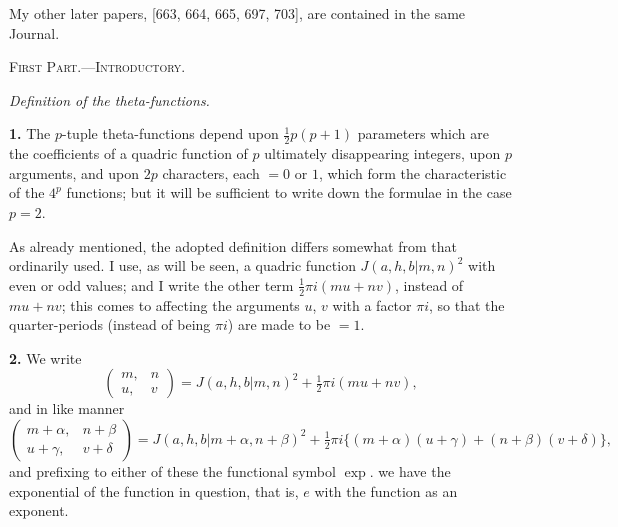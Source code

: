 \documentclass[12pt,a4paper]{article}
\newcommand{\cbtw}{\vert}  %
\theoremstyle{definition}
\begin{document}
My other later papers, [663, 664, 665, 697, 703], are contained in the same Journal.

\vspace{1em}

\begin{center}
\textsc{First Part.---Introductory.}
\end{center}

\vspace{0.5em}

\begin{center}
\textit{Definition of the theta-functions.}
\end{center}

\vspace{0.5em}

\noindent\textbf{1.}\quad
The $p$-tuple theta-functions depend upon $\frac{1}{2}p(p+1)$ parameters which are the coefficients of a quadric function of $p$ ultimately disappearing integers, upon $p$ arguments, and upon $2p$ characters, each $= 0$ or $1$, which form the characteristic of the $4^p$ functions; but it will be sufficient to write down the formulae in the case $p = 2$.

As already mentioned, the adopted definition differs somewhat from that ordinarily used. I use, as will be seen, a quadric function $J(a, h, b\cbtw m, n)^2$ with even or odd values; and I write the other term $\frac{1}{2}\pi i(mu + nv)$, instead of $mu + nv$; this comes to affecting the arguments $u$, $v$ with a factor $\pi i$, so that the quarter-periods (instead of being $\pi i$) are made to be $= 1$.

\noindent\textbf{2.}\quad
We write
\[
\begin{pmatrix} m, & n \\ u, & v \end{pmatrix} = J(a, h, b\cbtw m, n)^2 + \tfrac{1}{2}\pi i(mu + nv),
\]
and in like manner
\[
\begin{pmatrix} m + \alpha, & n + \beta \\ u + \gamma, & v + \delta \end{pmatrix} = J(a, h, b\cbtw m + \alpha, n + \beta)^2 + \tfrac{1}{2}\pi i\{(m + \alpha)(u + \gamma) + (n + \beta)(v + \delta)\},
\]
and prefixing to either of these the functional symbol $\exp.$ we have the exponential of the function in question, that is, $e$ with the function as an exponent.
\end{document}

